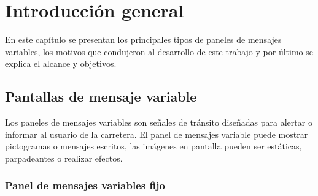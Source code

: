 
\chapter{Introducción general} %

\label{Chapter1} %
\label{IntroGeneral}
En este capítulo se presentan los principales tipos de paneles de mensajes variables, los motivos que condujeron al desarrollo de este trabajo y por último se explica el alcance y objetivos.

\newcommand{\keyword}[1]{\textbf{#1}}
\newcommand{\tabhead}[1]{\textbf{#1}}
\newcommand{\code}[1]{\texttt{#1}}
\newcommand{\file}[1]{\texttt{\bfseries#1}}
\newcommand{\option}[1]{\texttt{\itshape#1}}
\newcommand{\grados}{$^{\circ}$}



\section{Pantallas de mensaje variable}

Los paneles de mensajes variables son señales de tránsito diseñadas para alertar o informar al usuario de la carretera. El panel de mensajes variable puede mostrar pictogramas o mensajes escritos, las imágenes en pantalla pueden ser estáticas, parpadeantes o realizar efectos\cite{WIKIVMS}.

\subsection{Panel de mensajes variables fijo}

